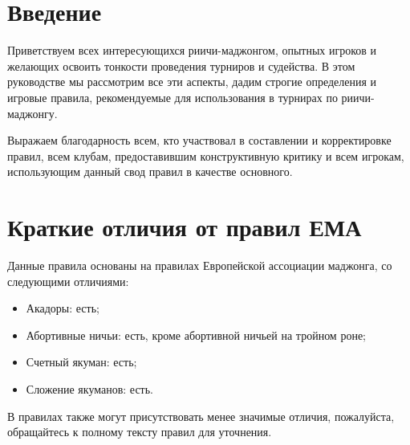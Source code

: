 \section{Введение}

Приветствуем всех интересующихся риичи-маджонгом, опытных игроков и желающих освоить тонкости проведения турниров и судейства. В этом руководстве мы рассмотрим все эти аспекты, дадим строгие определения и игровые правила, рекомендуемые для использования в турнирах по риичи-маджонгу.

Выражаем благодарность всем, кто участвовал в составлении и корректировке правил, всем клубам, предоставившим конструктивную критику и всем игрокам, использующим данный свод правил в качестве основного.

\newpage

\section{Краткие отличия от правил ЕМА}

Данные правила основаны на правилах Европейской ассоциации маджонга, со следующими отличиями:

\begin{itemize}
	\item Акадоры: есть;
	\item Абортивные ничьи: есть, кроме абортивной ничьей на тройном роне;
	\item Счетный якуман: есть;
	\item Сложение якуманов: есть.
\end{itemize}

В правилах также могут присутствовать менее значимые отличия, пожалуйста, обращайтесь к полному тексту правил для уточнения.
